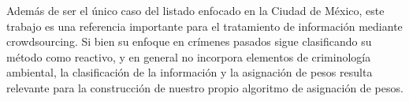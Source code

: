 Además de ser el único caso del listado enfocado en la Ciudad de México, este trabajo es una referencia importante para el tratamiento de información mediante crowdsourcing. Si bien su enfoque en crímenes pasados sigue clasificando su método como reactivo, y en general no incorpora elementos de criminología ambiental, la clasificación de la información y la asignación de pesos resulta relevante para la construcción de nuestro propio algoritmo de asignación de pesos.
